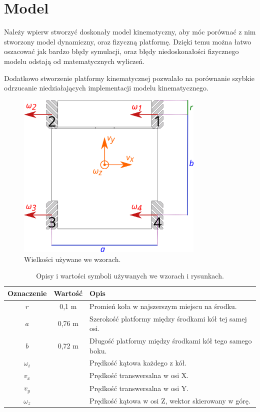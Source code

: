 \chapter{Model}
Należy wpierw stworzyć doskonały model kinematyczny, aby móc porównać z nim stworzony model dynamiczny, oraz fizyczną platformę.
Dzięki temu można łatwo oszacować jak bardzo błędy symulacji, oraz błędy niedoskonałości fizycznego modelu odstają od matematycznych wyliczeń.

Dodatkowo stworzenie platformy kinematycznej pozwalało na porównanie szybkie odrzucanie niedziałających implementacji modelu kinematycznego.
\begin{figure}[H]
\centering
 \includegraphics[width=0.8\textwidth]{graphics/base_dims.pdf}
\caption{Wielkości używane we wzorach.}
\label{fig:base_dims}
\end{figure} 

\begin{table}
\centering
\begin{tabular}{c c l}
Oznaczenie & Wartość & Opis \\
\hline
$r$ & 0,1 m & Promień koła w najszerszym miejscu na środku. \\
$a$ & 0,76 m & Szerokość platformy między środkami kół tej samej osi. \\
$b$ & 0,72 m & Długość platformy między środkami kół tego samego boku. \\
$\omega_i$ & & Prędkość kątowa każdego z kół. \\
$v_x$ & & Prędkość transwersalna w osi X. \\
$v_y$ & & Prędkość transwersalna w osi Y. \\
$\omega_z$ & & Prędkość kątowa w osi Z, wektor skierowany w górę. \\
\end{tabular}
\caption{Opisy i wartości symboli używanych we wzorach i rysunkach.}
\label{tab:dims}
\end{table}


